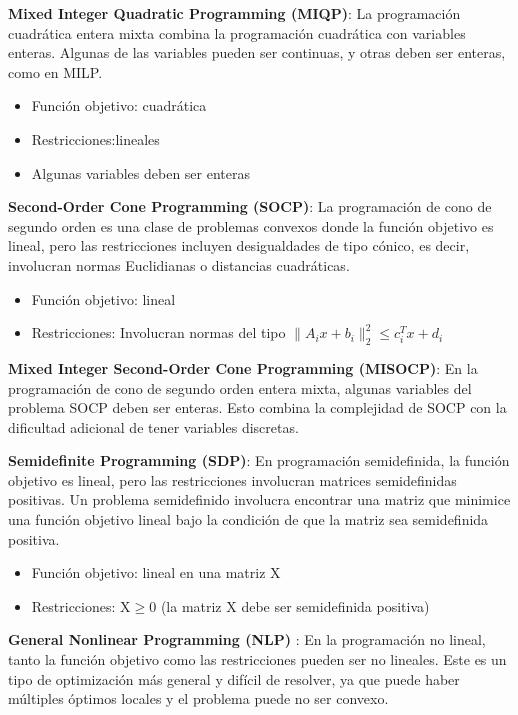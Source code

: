 \textbf{Mixed Integer Quadratic Programming (MIQP)}: La programación cuadrática entera mixta combina la programación cuadrática con variables enteras. Algunas de las variables pueden ser continuas, y otras deben ser enteras, como en MILP.

\begin{itemize}
	\item Función objetivo: cuadrática
	\item Restricciones:lineales
	\item Algunas variables deben ser enteras	
\end{itemize}

\textbf{Second-Order Cone Programming (SOCP)}: La programación de cono de segundo orden es una clase de problemas convexos donde la función objetivo es lineal, pero las restricciones incluyen desigualdades de tipo cónico, es decir, involucran normas Euclidianas o distancias cuadráticas.

\begin{itemize}
	\item Función objetivo: lineal
	\item Restricciones: Involucran normas del tipo $\| A_i x + b_i \|_2^2 \leq c_i^T x + d_i$	
\end{itemize}

\textbf{Mixed Integer Second-Order Cone Programming (MISOCP)}: En la programación de cono de segundo orden entera mixta, algunas variables del problema SOCP deben ser enteras. Esto combina la complejidad de SOCP con la dificultad adicional de tener variables discretas.

\textbf{Semidefinite Programming (SDP)}: En programación semidefinida, la función objetivo es lineal, pero las restricciones involucran matrices semidefinidas positivas. Un problema semidefinido involucra encontrar una matriz que minimice una función objetivo lineal bajo la condición de que la matriz sea semidefinida positiva.

\begin{itemize}
	\item Función objetivo: lineal en una matriz X
	\item Restricciones: X$\geq$0 (la matriz X debe ser semidefinida positiva)
\end{itemize}

\textbf{General Nonlinear Programming (NLP)
}: En la programación no lineal, tanto la función objetivo como las restricciones pueden ser no lineales. Este es un tipo de optimización más general y difícil de resolver, ya que puede haber múltiples óptimos locales y el problema puede no ser convexo.

